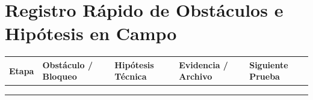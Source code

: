 \documentclass[10.5pt, a4paper]{article}
\begin{document}
\section{Registro Rápido de Obstáculos e Hipótesis en Campo}
\begingroup
\footnotesize
\renewcommand{\arraystretch}{1.8}
\noindent\begin{tabularx}{\textwidth}{|c|>{\hsize=1.0\hsize\raggedright\arraybackslash}X|>{\hsize=1.0\hsize\raggedright\arraybackslash}X|>{\hsize=1.0\hsize\raggedright\arraybackslash}X|>{\hsize=1.0\hsize\raggedright\arraybackslash}X|}
\hline
\rowcolor{gray!20}
\textbf{Etapa} & \textbf{Obstáculo / Bloqueo} & \textbf{Hipótesis Técnica} & \textbf{Evidencia / Archivo} & \textbf{Siguiente Prueba} \\ \hline
 & & & & \\[0.35cm] \hline
 & & & & \\[0.35cm] \hline
 & & & & \\[0.35cm] \hline
\end{tabularx}\par
\endgroup
\end{document}
